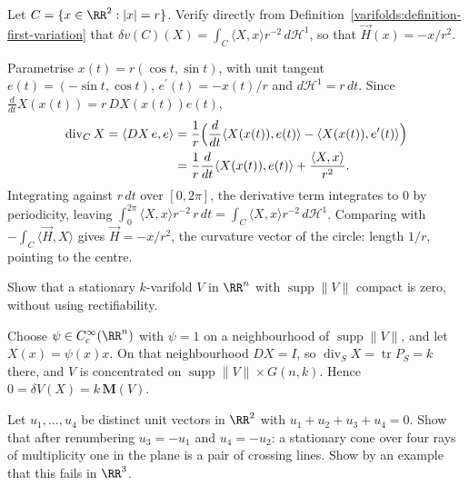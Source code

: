 \begin{exercise}\label{varifolds:exercise-circle}
Let $C = \{x \in \RR^2 : |x| = r\}$. Verify directly from Definition~\ref{varifolds:definition-first-variation} that $\delta v(C)(X) = \int_C\langle X, x\rangle r^{-2}\,d\mathcal{H}^1$, so that $\vec{H}(x) = -x/r^2$.
\end{exercise}

\begin{solution}
Parametrise $x(t) = r(\cos t, \sin t)$, with unit tangent $e(t) = (-\sin t, \cos t)$, $e^{\prime}(t) = -x(t)/r$ and $d\mathcal{H}^1 = r\,dt$. Since $\frac{d}{dt}X(x(t)) = r\,DX(x(t))e(t)$,
\[
\begin{aligned}
\operatorname{div}_CX = \langle DX\,e, e\rangle &= \frac1r\Bigl(\frac{d}{dt}\langle X(x(t)), e(t)\rangle - \langle X(x(t)), e^{\prime}(t)\rangle\Bigr) \\
&= \frac1r\frac{d}{dt}\langle X(x(t)), e(t)\rangle + \frac{\langle X, x\rangle}{r^2} .
\end{aligned}
\]
Integrating against $r\,dt$ over $[0, 2\pi]$, the derivative term integrates to $0$ by periodicity, leaving $\int_0^{2\pi}\langle X, x\rangle r^{-2}\,r\,dt = \int_C\langle X, x\rangle r^{-2}\,d\mathcal{H}^1$.
Comparing with $-\int_C\langle\vec{H}, X\rangle$ gives $\vec{H} = -x/r^2$, the curvature vector of the circle: length $1/r$, pointing to the centre.
\end{solution}

\begin{exercise}\label{varifolds:exercise-compact-support}
Show that a stationary $k$-varifold $V$ in $\RR^n$ with $\operatorname{supp}\|V\|$ compact is zero, without using rectifiability.
\end{exercise}

\begin{solution}
Choose $\psi \in C^\infty_c(\RR^n)$ with $\psi = 1$ on a neighbourhood of $\operatorname{supp}\|V\|$, and let $X(x) = \psi(x)x$. On that neighbourhood $DX = I$, so $\operatorname{div}_SX = \operatorname{tr}P_S = k$
there, and $V$ is concentrated on $\operatorname{supp}\|V\| \times G(n, k)$. Hence $0 = \delta V(X) = k\,\mathbf{M}(V)$.
\end{solution}

\begin{exercise}\label{varifolds:exercise-four-rays}
Let $u_1, \ldots, u_4$ be distinct unit vectors in $\RR^2$ with $u_1 + u_2 + u_3 + u_4 = 0$. Show that after renumbering $u_3 = -u_1$ and $u_4 = -u_2$: a stationary cone over four rays of multiplicity
one in the plane is a pair of crossing lines. Show by an example that this fails in $\RR^3$.
\end{exercise}

